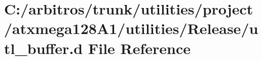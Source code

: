 \hypertarget{utilities_2project_2atxmega128_a1_2utilities_2_release_2utl__buffer_8d}{\section{C\-:/arbitros/trunk/utilities/project/atxmega128\-A1/utilities/\-Release/utl\-\_\-buffer.d File Reference}
\label{utilities_2project_2atxmega128_a1_2utilities_2_release_2utl__buffer_8d}
}
